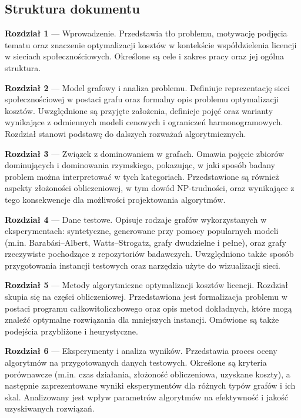 \subsection*{Struktura dokumentu}
\begin{description}
    \item \textbf{Rozdział 1} --- Wprowadzenie. Przedstawia tło problemu, motywację podjęcia tematu oraz znaczenie optymalizacji kosztów w kontekście współdzielenia licencji w sieciach społecznościowych. Określone są cele i zakres pracy oraz jej ogólna struktura.
    
    \item \textbf{Rozdział 2} --- Model grafowy i analiza problemu. Definiuje reprezentację sieci społecznościowej w postaci grafu oraz formalny opis problemu optymalizacji kosztów. Uwzględnione są przyjęte założenia, definicje pojęć oraz warianty wynikające z odmiennych modeli cenowych i ograniczeń harmonogramowych. Rozdział stanowi podstawę do dalszych rozważań algorytmicznych.
    
    \item \textbf{Rozdział 3} --- Związek z dominowaniem w grafach. Omawia pojęcie zbiorów dominujących i dominowania rzymskiego, pokazując, w jaki sposób badany problem można interpretować w tych kategoriach. Przedstawione są również aspekty złożoności obliczeniowej, w tym dowód NP-trudności, oraz wynikające z tego konsekwencje dla możliwości projektowania algorytmów.
    
    \item \textbf{Rozdział 4} --- Dane testowe. Opisuje rodzaje grafów wykorzystanych w eksperymentach: syntetyczne, generowane przy pomocy popularnych modeli (m.in. Barabási–Albert, Watts–Strogatz, grafy dwudzielne i pełne), oraz grafy rzeczywiste pochodzące z repozytoriów badawczych. Uwzględniono także sposób przygotowania instancji testowych oraz narzędzia użyte do wizualizacji sieci.
    
    \item \textbf{Rozdział 5} --- Metody algorytmiczne optymalizacji kosztów licencji. Rozdział skupia się na części obliczeniowej. Przedstawiona jest formalizacja problemu w postaci programu całkowitoliczbowego oraz opis metod dokładnych, które mogą znaleźć optymalne rozwiązania dla mniejszych instancji. Omówione są także podejścia przybliżone i heurystyczne. 
    
    \item \textbf{Rozdział 6} --- Eksperymenty i analiza wyników. Przedstawia proces oceny algorytmów na przygotowanych danych testowych. Określone są kryteria porównawcze (m.in. czas działania, złożoność obliczeniowa, uzyskane koszty), a następnie zaprezentowane wyniki eksperymentów dla różnych typów grafów i ich skal. Analizowany jest wpływ parametrów algorytmów na efektywność i jakość uzyskiwanych rozwiązań.
    

\end{description}
